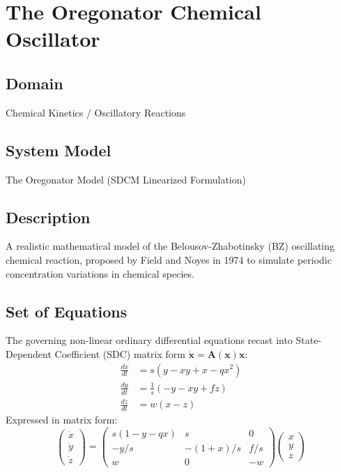 \chapter{The Oregonator Chemical Oscillator}

\section{Domain}
Chemical Kinetics / Oscillatory Reactions

\section{System Model}
The Oregonator Model (SDCM Linearized Formulation)

\section{Description}
A realistic mathematical model of the Belousov-Zhabotinsky (BZ) oscillating chemical reaction, proposed by Field and Noyes in 1974 to simulate periodic concentration variations in chemical species.

\section{Set of Equations}
The governing non-linear ordinary differential equations recast into State-Dependent Coefficient (SDC) matrix form $\dot{\mathbf{x}} = \mathbf{A}(\mathbf{x})\mathbf{x}$:
\begin{align}
\frac{dx}{dt} &= s \left( y - xy + x - qx^2 \right) \\
\frac{dy}{dt} &= \frac{1}{s} \left( -y - xy + fz \right) \\
\frac{dz}{dt} &= w (x - z)
\end{align}
Expressed in matrix form:
\begin{equation}
\begin{pmatrix} \dot{x} \\ \dot{y} \\ \dot{z} \end{pmatrix} = \begin{pmatrix} s(1 - y - qx) & s & 0 \\ -y/s & -(1+x)/s & f/s \\ w & 0 & -w \end{pmatrix} \begin{pmatrix} x \\ y \\ z \end{pmatrix}
\end{equation}

